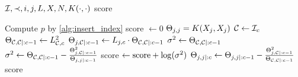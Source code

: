 \begin{algorithmic}[1]
  \REQUIRE \( \mathcal{I}, \prec, i, j, L, X, N, K(\cdot, \cdot) \)
  \ENSURE score

  \STATE Compute \( p \) by \cref{alg:insert_index}
  \STATE score \( \gets 0 \)
  \STATE \( \Theta_{j, j} = K(X_j, X_j) \)
    \STATE \( \mathcal{C} \gets \mathcal{I}_c \)
    \STATE \( \Theta_{\mathcal{C}, \mathcal{C} \mid :c - 1}
      \gets L_{\mathcal{C}, c}^2
    \)
    \STATE \( \Theta_{j, \mathcal{C} \mid :c - 1}
      \gets L_{j, c} \cdot \Theta_{\mathcal{C}, \mathcal{C} \mid :c - 1}
    \)
      \STATE \( \sigma^2 \gets \Theta_{\mathcal{C}, \mathcal{C} \mid :c - 1} \)
        \STATE \( \sigma^2 \gets
          \Theta_{\mathcal{C}, \mathcal{C} \mid :c - 1} -
          \frac{\Theta_{j, \mathcal{C} \mid :c - 1}^2}{\Theta_{j, j \mid :c - 1}}
        \)
      \ENDIF
      \STATE score \( \gets \text{score} + \log(\sigma^2) \)
    \ENDIF
    \STATE \( \Theta_{j, j \mid :c} \gets \Theta_{j, j \mid :c - 1} -
      \frac{\Theta_{j, \mathcal{C} \mid :c - 1}^2}
           {\Theta_{\mathcal{C}, \mathcal{C} \mid :c - 1}}
    \)
  \ENDFOR
  \RETURN score
\end{algorithmic}
